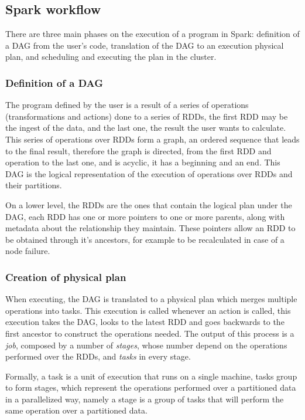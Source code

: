 \documentclass[11pt]{book} %
\begin{document}
      \subsection{Spark workflow}

        There are three main phases on the execution of a program in Spark: definition of a DAG from the user's code, translation of the DAG to an execution physical plan, and scheduling and executing the plan in the cluster.

        \subsubsection{Definition of a DAG}

          The program defined by the user is a result of a series of operations (transformations and actions) done to a series of RDDs, the first RDD may be the ingest of the data, and the last one, the result the user wants to calculate. This series of operations over RDDs form a graph, an ordered sequence that leads to the final result, therefore the graph is directed, from the first RDD and operation to the last one, and is acyclic, it has a beginning and an end. This DAG is the logical representation of the execution of operations over RDDs and their partitions.

          On a lower level, the RDDs are the ones that contain the logical plan under the DAG, each RDD has one or more pointers to one or more parents, along with metadata about the relationship they maintain. These pointers allow an RDD to be obtained through it's ancestors, for example to be recalculated in case of a node failure.

        \subsubsection{Creation of physical plan}

          When executing, the DAG is translated to a physical plan which merges multiple operations into tasks. This execution is called whenever an action is called, this execution takes the DAG, looks to the latest RDD and goes backwards to the first ancestor to construct the operations needed. The output of this process is a \emph{job}, composed by a number of \emph{stages}, whose number depend on the operations performed over the RDDs, and \emph{tasks} in every stage.

          Formally, a task is a unit of execution that runs on a single machine, tasks group to form stages, which represent the operations performed over a partitioned data in a parallelized way, namely a stage is a group of tasks that will perform the same operation over a partitioned data.
\end{document}
